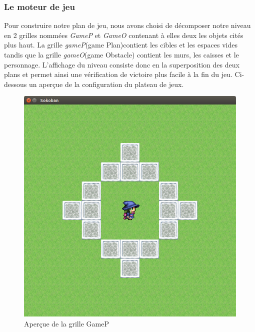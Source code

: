 \documentclass{article}
\begin{document}
		\subsubsection{Le moteur de jeu}	
Pour construire notre plan de jeu, nous avons choisi de décomposer notre niveau en 2 grilles nommées 
\textit{GameP} et \textit{GameO} contenant à elles deux les objets cités plus haut. La grille 
\textit{gameP}(game Plan)contient les cibles et les espaces vides tandis que la grille 
\textit{gameO}(game Obstacle) contient les murs, les caisses et le personnage. L'affichage du niveau 
consiste donc en la superposition des deux plans et permet ainsi une vérification de victoire plus facile
à la fin du jeu. Ci-dessous un aperçue de la configuration du plateau de jeux.
\begin{figure}[h]
\begin{center}
\begin{minipage}[b]{0.4\textwidth}
\includegraphics[width=\textwidth]{img/07.png}
\caption{Aperçue de la grille GameP}
\end{minipage}
\hfill
\begin{minipage}[b]{0.4\textwidth}

\end{minipage}
\end{center}
\end{figure}
\end{document}
